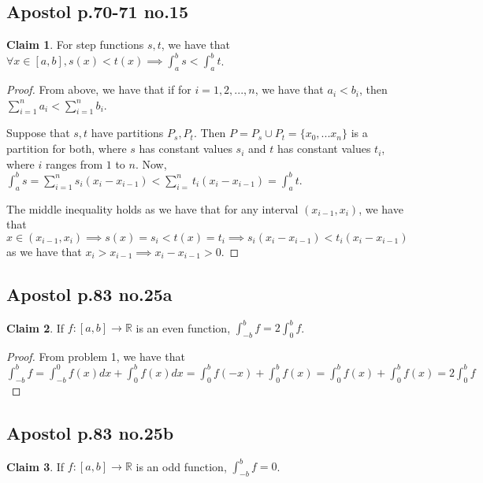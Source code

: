 \documentclass[12pt,letterpaper]{article}
\theoremstyle{definition}
\newtheorem*{claim}{Claim}
\newcommand{\R}{\mathbb{R}}
\begin{document}
\subsection*{Apostol p.70-71 no.15}

\begin{claim}
  For step functions $s,t$, we have that $\forall x \in [a,b], s(x) < t(x) \implies \int_a^b s < \int_a^b t$.
\end{claim}

\begin{proof}
  From above, we have that if for $i = 1,2,...,n$, we have that $a_i < b_i$, then $\sum_{i=1}^na_i < \sum_{i=1}^nb_i$.
  
  Suppose that $s,t$ have partitions $P_s, P_t$. Then $P = P_s \cup P_t = \{x_0,...x_n\}$ is a partition for both, where $s$ has constant values $s_i$ and $t$ has constant values $t_i$, where $i$ ranges from $1$ to $n$.
  Now, $\int_a^b s = \sum_{i=1}^n s_i(x_i - x_{i-1}) < \sum_{i=}^n t_i(x_i - x_{i-1}) = \int_a^b t$.
  
  The middle inequality holds as we have that for any interval $(x_{i-1},x_i)$, we have that $x \in (x_{i-1},x_i) \implies s(x) = s_i < t(x) = t_i \implies s_i(x_i - x_{i-1}) < t_i(x_i - x_{i-1})$ as we have that $x_i > x_{i-1} \implies x_i - x_{i-1} > 0$.
  
\end{proof}

\subsection*{Apostol p.83 no.25a}

\begin{claim}
  If $f:[a,b] \rightarrow \R$ is an even function, $\int_{-b}^b f = 2\int_0^b f$.
\end{claim}

\begin{proof}
  From problem 1, we have that $\int_{-b}^b f = \int_{-b}^0f(x)dx  + \int_0^b f(x)dx = \int_0^b f(-x) + \int_0^b f(x)  = \int_0^b f(x) + \int_0^b f(x) = 2\int_0^b f $
\end{proof}

\subsection*{Apostol p.83 no.25b}

\begin{claim}
  If $f:[a,b] \rightarrow \R$ is an odd function, $\int_{-b}^b f = 0$.
\end{claim}
\end{document}
